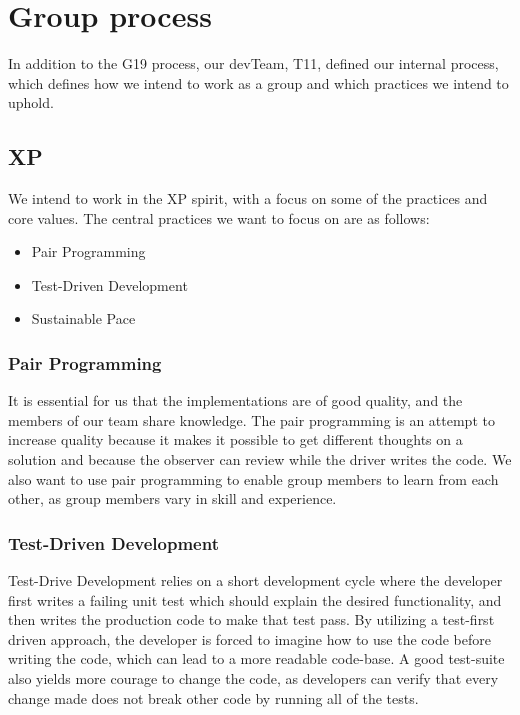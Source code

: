 \section{Group process}

In addition to the \gls{G19} process, our \gls{devTeam}, \gls{T11}, defined our internal process, which defines how we intend to work as a group and which practices we intend to uphold.

\subsection{XP}

We intend to work in the \gls{XP} spirit, with a focus on some of the practices and core values. The central practices we want to focus on are as follows:

\begin{itemize}
    \item Pair Programming
    \item Test-Driven Development
    \item Sustainable Pace
\end{itemize}

\subsubsection{Pair Programming}

It is essential for us that the implementations are of good quality, and the members of our team share knowledge. The pair programming is an attempt to increase quality because it makes it possible to get different thoughts on a solution and because the observer can review while the \gls{driver} writes the code. We also want to use pair programming to enable group members to learn from each other, as group members vary in skill and experience.

\subsubsection{Test-Driven Development}

Test-Drive Development relies on a short development cycle where the developer first writes a failing unit test which should explain the desired functionality, and then writes the production code to make that test pass. By utilizing a test-first driven approach, the developer is forced to imagine how to use the code before writing the code, which can lead to a more readable code-base. A good test-suite also yields more courage to change the code, as developers can verify that every change made does not break other code by running all of the tests.

